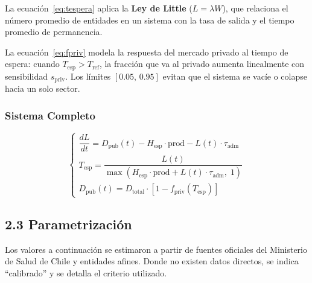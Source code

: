 \documentclass[12pt,a4paper]{article}
\begin{document}
La ecuación~\eqref{eq:tespera} aplica la \textbf{Ley de Little} ($L = \lambda W$), que relaciona el número promedio de entidades en un sistema con la tasa de salida y el tiempo promedio de permanencia.

La ecuación~\eqref{eq:fpriv} modela la respuesta del mercado privado al tiempo de espera: cuando $T_{\text{esp}} > T_{\text{ref}}$, la fracción que va al privado aumenta linealmente con sensibilidad $s_{\text{priv}}$. Los límites $[0.05,\, 0.95]$ evitan que el sistema se vacíe o colapse hacia un solo sector.

\subsubsection*{Sistema Completo}

\begin{equation}
\begin{cases}
\dfrac{dL}{dt} = D_{\text{pub}}(t) - H_{\text{esp}}\cdot\text{prod} - L(t)\cdot\tau_{\text{adm}} \\[8pt]
T_{\text{esp}} = \dfrac{L(t)}{\max\!\left(H_{\text{esp}}\cdot\text{prod} + L(t)\cdot\tau_{\text{adm}},\;1\right)} \\[8pt]
D_{\text{pub}}(t) = D_{\text{total}}\cdot\left[1 - f_{\text{priv}}\!\left(T_{\text{esp}}\right)\right]
\end{cases}
\label{eq:sistema}
\end{equation}

\subsection{2.3 Parametrización}

\begin{databox}
Los valores a continuación se estimaron a partir de fuentes oficiales del Ministerio de Salud de Chile y entidades afines. Donde no existen datos directos, se indica ``calibrado'' y se detalla el criterio utilizado.
\end{databox}
\end{document}
